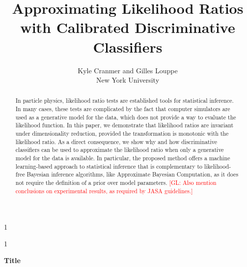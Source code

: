 \documentclass[12pt]{article}
\newcommand{\blind}{1}
\numberwithin{equation}{section}
\theoremstyle{plain}
\newcommand{\glnote}[1]{\textcolor{red}{[GL: #1]}}
\begin{document}
\def\spacingset#1{\renewcommand{\baselinestretch}%
{#1}\small\normalsize} \spacingset{1}



\blind
{
  \title{\bf Approximating Likelihood Ratios with Calibrated Discriminative Classifiers}
  \author{Kyle Cranmer and Gilles Louppe\\
          New York University}
  \maketitle
} \fi

\blind
{
  \bigskip
  \bigskip
  \bigskip
  \begin{center}
    {\LARGE\bf Title}
\end{center}
  \medskip
} \fi

\bigskip
\begin{abstract}


In particle physics, likelihood ratio tests are established tools for
statistical inference. In many cases, these tests are complicated by the fact
that computer simulators are used as a generative model for the data, which does
not provide a way to evaluate the likelihood function. In this paper, we
demonstrate that likelihood ratios are invariant under dimensionality reduction,
provided the transformation is monotonic with the likelihood ratio. As a direct
consequence, we show why and how discriminative classifiers can be used to
approximate the likelihood ratio when only a generative model for the data is
available. In particular, the proposed method offers a machine learning-based
approach to statistical inference that is complementary to likelihood-free
Bayesian inference algorithms, like Approximate Bayesian Computation, as it does
not require the definition of a prior over model parameters. \glnote{Also
mention conclusions on experimental results, as required by JASA guidelines.}

\end{abstract}
\end{document}

